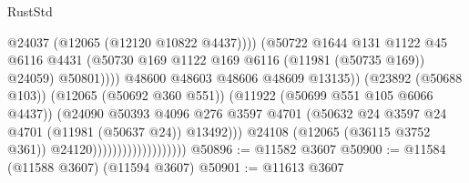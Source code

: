 \begin{lexlean}{RustStd}
\begin{coremodule}
                                                          @24037
                                                          (@12065 (@12120 @10822 @4437))))
                                                      (@50722
                                                        @1644
                                                        @131
                                                        @1122
                                                        @45
                                                        @6116
                                                        @4431
                                                        (@50730
                                                          @169
                                                          @1122
                                                          @169
                                                          @6116
                                                          (@11981 (@50735 @169))
                                                          @24059)
                                                        @50801))))
                                                @48600
                                                @48603
                                                @48606
                                                @48609
                                                @13135))
                                            (@23892 (@50688 @103))
                                            (@12065 (@50692 @360 @551))
                                            (@11922 (@50699 @551 @105 @6066 @4437))
                                            (@24090
                                              @50393
                                              @4096
                                              @276
                                              @3597
                                              @4701
                                              (@50632
                                                @24
                                                @3597
                                                @24
                                                @4701
                                                (@11981 (@50637 @24))
                                                @13492)))
                                          @24108
                                          (@12065 (@36115 @3752 @361))
                                          @24120)))))))))))))))))))
@50896 := @11582 @3607
@50900 := @11584 (@11588 @3607) (@11594 @3607)
@50901 := @11613 @3607

\end{coremodule}
\end{lexlean}
